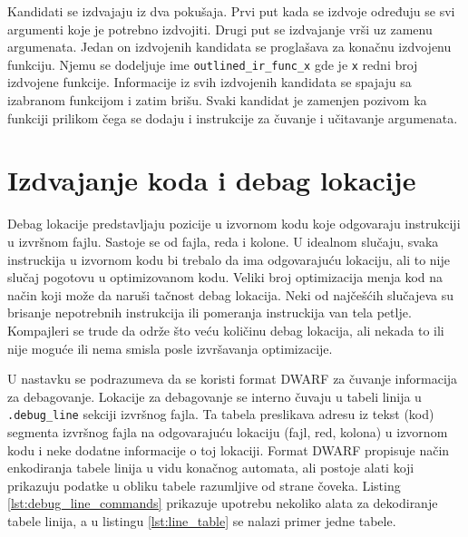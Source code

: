 \documentclass[12pt,oneside]{memoir}
\begin{document}
Kandidati se izdvajaju iz dva pokušaja. Prvi put kada se izdvoje određuju se svi argumenti koje je potrebno izdvojiti.
Drugi put se izdvajanje vrši uz zamenu argumenata. Jedan on izdvojenih kandidata se proglašava za konačnu izdvojenu funkciju.
Njemu se dodeljuje ime \verb|outlined_ir_func_x| gde je \verb|x| redni broj izdvojene funkcije.
Informacije iz svih izdvojenih kandidata se spajaju sa izabranom funkcijom i zatim brišu.
Svaki kandidat je zamenjen pozivom ka funkciji prilikom čega se dodaju i instrukcije za čuvanje i učitavanje argumenata.

\section{Izdvajanje koda i debag lokacije}

\label{sec:izdvajanje_koda_debag}


Debag lokacije predstavljaju pozicije u izvornom kodu koje odgovaraju instrukciji u izvršnom fajlu. Sastoje se od fajla, reda i kolone.
U idealnom slučaju, svaka instruckija u izvornom kodu bi trebalo da ima odgovarajuću lokaciju, ali to nije slučaj pogotovu u optimizovanom kodu.
Veliki broj optimizacija menja kod na način koji može da naruši tačnost debag lokacija.
Neki od najčešćih slučajeva su brisanje nepotrebnih instrukcija ili pomeranja instruckija van tela petlje.
Kompajleri se trude da održe što veću količinu debag lokacija, ali nekada to ili nije moguće ili nema smisla posle izvršavanja optimizacije.

U nastavku se podrazumeva da se koristi format DWARF za čuvanje informacija za debagovanje.
Lokacije za debagovanje se interno čuvaju u tabeli linija u \verb|.debug_line| sekciji izvršnog fajla.
Ta tabela preslikava adresu iz tekst (kod) segmenta izvršnog fajla na odgovarajuću lokaciju (fajl, red, kolona) u izvornom kodu i neke dodatne informacije o toj lokaciji.
Format DWARF propisuje način enkodiranja tabele linija u vidu konačnog automata, ali postoje alati koji prikazuju podatke u obliku tabele razumljive od strane čoveka.
Listing \ref{lst:debug_line_commands} prikazuje upotrebu nekoliko alata za dekodiranje tabele linija, a u listingu \ref{lst:line_table} se nalazi primer jedne tabele.
\end{document}
